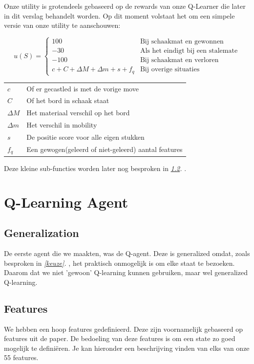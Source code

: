 \documentclass[a4paper,openany]{uantwerpenassignment}
\makeatletter
\newenvironment{conditions}
  {\par\vspace{\abovedisplayskip}\noindent\begin{tabular}{>{$}l<{$} @{${}={}$} l}}
  {\end{tabular}\par\vspace{\belowdisplayskip}}
\newcommand{\reference}[1]{\textit{\ref{#1}. \nameref{#1}}}
\makeatother
\begin{document}
Onze utility is grotendeels gebaseerd op de rewards van onze Q-Learner die later in dit verslag behandelt worden.
Op dit moment volstaat het om een simpele versie van onze utility te aanschouwen:


$$
u(S) = 
\begin{cases}
 100 &\mbox{Bij schaakmat en gewonnen}\\
    -30 &\mbox{Als het eindigt bij een stalemate}\\
    -100 &\mbox{Bij schaakmat en verloren}\\
    c + C + \Delta M + \Delta m + s + f_q &\mbox{Bij overige situaties}
\end{cases}
$$

\begin{conditions}
    c & Of er gecastled is met de vorige move\\
    C & Of het bord in schaak staat\\
    \Delta M & Het materiaal verschil op het bord\\
    \Delta m & Het verschil in mobility\\
    s & De positie score voor alle eigen stukken\\
    f_q & Een gewogen(geleerd of niet-geleerd) aantal features
\end{conditions}

Deze kleine sub-functies worden later nog besproken in \reference{features}.

\chapter{Q-Learning Agent}

\section{Generalization}

De eerste agent die we maakten, was de Q-agent. Deze is generalized omdat, zoals besproken in \reference{keuze}, het praktisch onmogelijk is om elke staat te bezoeken. Daarom dat we niet 'gewoon' Q-learning kunnen gebruiken, maar wel generalized Q-learning.

\section{Features}
\label{features}

We hebben een hoop features gedefinieerd. Deze zijn voornamelijk gebaseerd op features uit de paper\cite{rl}. De bedoeling van deze features is om een state zo goed mogelijk te definiëren. Je kan hieronder een beschrijving vinden van elks van onze 55 features.
\end{document}
